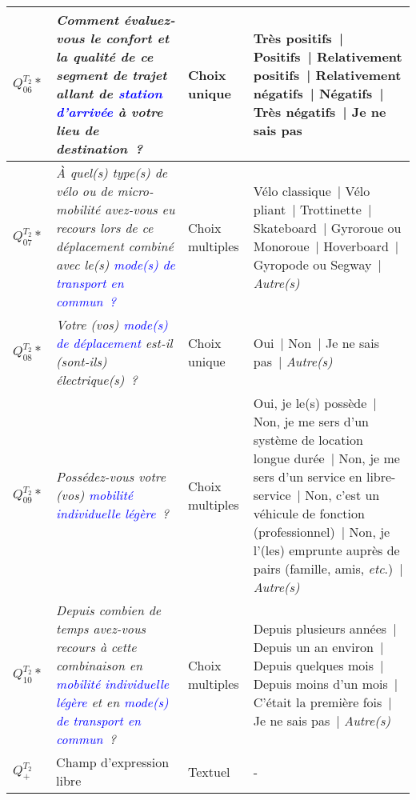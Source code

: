 \begin{table}[h!]
{\begin{tabular}{p{}p{}p{}p{}}
\hline
    \small{\textbf{\(Q_{06}^{T_{2}}*\)}} & \small{\textsl{Comment évaluez-vous le confort et la qualité de ce segment de trajet allant de \textcolor{blue}{station d'arrivée} à votre lieu de destination~?}} & \small{Choix unique} & \small{Très positifs~| Positifs~| Relativement positifs~| Relativement négatifs~| Négatifs~| Très négatifs~| Je ne sais pas}\\
\hline
    \small{\textbf{\(Q_{07}^{T_{2}}*\)}} & \small{\textsl{À quel(s) type(s) de vélo ou de micro-mobilité avez-vous eu recours lors de ce déplacement combiné avec le(s) \textcolor{blue}{mode(s) de transport en commun~?}}} & \small{Choix multiples} & \small{Vélo classique~| Vélo pliant~| Trottinette~| Skateboard~| Gyroroue ou Monoroue~| Hoverboard~| Gyropode ou Segway~| \textsl{Autre(s)}}\\
\hline
    \small{\textbf{\(Q_{08}^{T_{2}}*\)}} & \small{\textsl{Votre (vos) \textcolor{blue}{mode(s) de déplacement} est-il (sont-ils) électrique(s)~?}} & \small{Choix unique} & \small{Oui~| Non~| Je ne sais pas~| \textsl{Autre(s)}}\\
\hline
    \small{\textbf{\(Q_{09}^{T_{2}}*\)}} & \small{\textsl{Possédez-vous votre (vos) \textcolor{blue}{mobilité individuelle légère}~?}} & \small{Choix multiples} & \small{Oui, je le(s) possède~| Non, je me sers d'un système de location longue durée~| Non, je me sers d'un service en libre-service~| Non, c'est un véhicule de fonction (professionnel)~| Non, je l'(les) emprunte auprès de pairs (famille, amis, \textsl{etc}.)~| \textsl{Autre(s)}}\\
\hline
    \small{\textbf{\(Q_{10}^{T_{2}}*\)}} & \small{\textsl{Depuis combien de temps avez-vous recours à cette combinaison en \textcolor{blue}{mobilité individuelle légère} et en \textcolor{blue}{mode(s) de transport en commun}~?}} & \small{Choix multiples} & \small{Depuis plusieurs années~| Depuis un an environ~| Depuis quelques mois~| Depuis moins d'un mois~| C'était la première fois~| Je ne sais pas~| \textsl{Autre(s)}}\\
\hline
    \small{\textbf{\(Q_{+}^{T_{2}}\)}} & \small{Champ d'expression libre} & \small{Textuel} & \small{-}\\
      \hline
    \end{tabular}}
    \caption*{}
    \vspace{5pt}
        \end{table}

